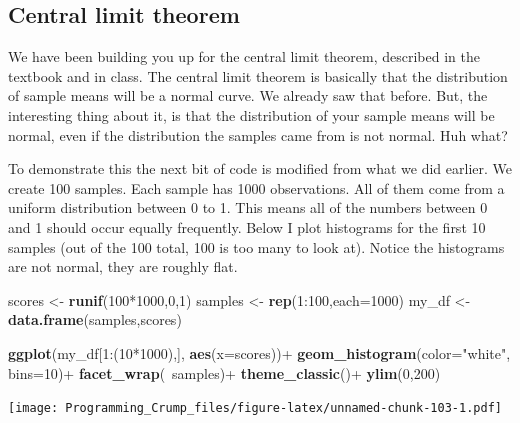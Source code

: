 \documentclass[]{book}
\newenvironment{Shaded}{\begin{snugshade}}{\end{snugshade}}
\newcommand{\KeywordTok}[1]{\textcolor[rgb]{0.13,0.29,0.53}{\textbf{{#1}}}}
\newcommand{\DataTypeTok}[1]{\textcolor[rgb]{0.13,0.29,0.53}{{#1}}}
\newcommand{\DecValTok}[1]{\textcolor[rgb]{0.00,0.00,0.81}{{#1}}}
\newcommand{\StringTok}[1]{\textcolor[rgb]{0.31,0.60,0.02}{{#1}}}
\newcommand{\NormalTok}[1]{{#1}}
\theoremstyle{definition}
\theoremstyle{definition}
\theoremstyle{definition}
\theoremstyle{remark}
\begin{document}
\subsection{Central limit theorem}\label{central-limit-theorem}

We have been building you up for the central limit theorem, described in
the textbook and in class. The central limit theorem is basically that
the distribution of sample means will be a normal curve. We already saw
that before. But, the interesting thing about it, is that the
distribution of your sample means will be normal, even if the
distribution the samples came from is not normal. Huh what?

To demonstrate this the next bit of code is modified from what we did
earlier. We create 100 samples. Each sample has 1000 observations. All
of them come from a uniform distribution between 0 to 1. This means all
of the numbers between 0 and 1 should occur equally frequently. Below I
plot histograms for the first 10 samples (out of the 100 total, 100 is
too many to look at). Notice the histograms are not normal, they are
roughly flat.

\begin{Shaded}
\begin{Highlighting}[]
\NormalTok{scores <-}\StringTok{ }\KeywordTok{runif}\NormalTok{(}\DecValTok{100}\NormalTok{*}\DecValTok{1000}\NormalTok{,}\DecValTok{0}\NormalTok{,}\DecValTok{1}\NormalTok{)}
\NormalTok{samples <-}\StringTok{ }\KeywordTok{rep}\NormalTok{(}\DecValTok{1}\NormalTok{:}\DecValTok{100}\NormalTok{,}\DataTypeTok{each=}\DecValTok{1000}\NormalTok{)}
\NormalTok{my_df <-}\StringTok{ }\KeywordTok{data.frame}\NormalTok{(samples,scores)}

\KeywordTok{ggplot}\NormalTok{(my_df[}\DecValTok{1}\NormalTok{:(}\DecValTok{10}\NormalTok{*}\DecValTok{1000}\NormalTok{),], }\KeywordTok{aes}\NormalTok{(}\DataTypeTok{x=}\NormalTok{scores))+}
\StringTok{  }\KeywordTok{geom_histogram}\NormalTok{(}\DataTypeTok{color=}\StringTok{"white"}\NormalTok{, }\DataTypeTok{bins=}\DecValTok{10}\NormalTok{)+}
\StringTok{  }\KeywordTok{facet_wrap}\NormalTok{(~samples)+}
\StringTok{  }\KeywordTok{theme_classic}\NormalTok{()+}
\StringTok{  }\KeywordTok{ylim}\NormalTok{(}\DecValTok{0}\NormalTok{,}\DecValTok{200}\NormalTok{)}
\end{Highlighting}
\end{Shaded}

\texttt{[image: Programming\_Crump\_files/figure-latex/unnamed-chunk-103-1.pdf]}
\end{document}
